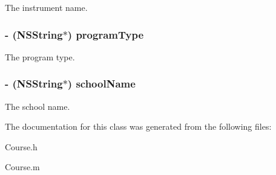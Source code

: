 \-The instrument name. \hypertarget{interface_course_a75b262e8885356165a97a15b69bf1ff1}{
\subsubsection[{program\-Type}]{\setlength{\rightskip}{0pt plus 5cm}-\/ (\-N\-S\-String$\ast$) {\bf program\-Type}}}\label{interface_course_a75b262e8885356165a97a15b69bf1ff1}
\-The program type. \hypertarget{interface_course_abb8051bfc97aff735cbb00e75f2fef65}{
\subsubsection[{school\-Name}]{\setlength{\rightskip}{0pt plus 5cm}-\/ (\-N\-S\-String$\ast$) {\bf school\-Name}}}\label{interface_course_abb8051bfc97aff735cbb00e75f2fef65}
\-The school name. 

\-The documentation for this class was generated from the following files\-:\begin{DoxyCompactItemize}
\item 
\-Course.\-h\item 
\-Course.\-m\end{DoxyCompactItemize}
